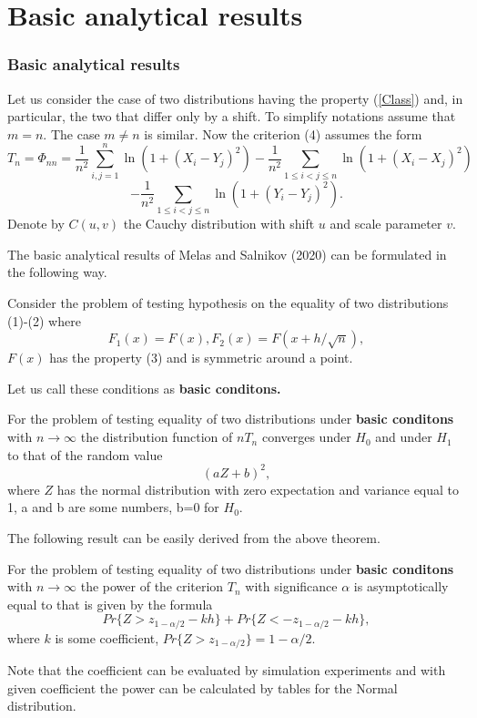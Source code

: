 \documentclass[slidestop,usepdftitle=false]{beamer}
\begin{document}
\section{Basic analytical results}
\begin{slide}
\frametitle{Basic analytical results}
Let us consider the case of two distributions having the property (\ref{Class}) and, in particular, the two that differ only by a shift. To simplify notations assume that $m=n$. The case $m\ne n$ is similar.
Now the criterion  (4)  assumes the form
\begin{equation}
T_n=\Phi_{nn}= \frac{1}{n^2}\sum_{i,j=1}^n \ln(1 + (X_i - Y_j)^2)-\frac{1}{n^2}\sum_{1\leq i<j\leq n}  \ln(1 + (X_i - X_j)^2)
\end{equation}
\begin{equation}
-  \frac{1}{n^2}\sum_{1\leq i<j\leq n}  \ln(1 + (Y_i - Y_j)^2).
\end{equation}
Denote by $C(u,v)$ the Cauchy distribution with shift $u$ and scale parameter $v$.
\end{slide}
\begin{slide}
The basic analytical results of  Melas and Salnikov (2020) can be formulated in the following way.

\bigskip
\bigskip
Consider the problem of testing hypothesis on the equality of two distributions (1)-(2) where
$$
 F_1(x)=F(x), 
 F_2(x)=F(x + h/\sqrt{n}),
 $$
 $F(x)$  has the property (3) and is symmetric around a point.
  
Let us call these conditions as \bf{basic conditons}. 
 \end{slide}
 \begin{slide}
 \bigskip
 \bigskip


 \begin{theorem}
For the problem of testing equality of two distributions under {\bf basic conditons} with $n \to \infty$
the distribution function of $nT_n$  converges under $H_0$ and  under $H_1$ to that of the random value
\begin{equation*}
(aZ + b)^2,
\end{equation*}
where  $Z$ has the normal distribution with zero expectation and variance equal to 1, a and
b are some numbers, b=0 for $H_0$.
\end{theorem}
\end{slide}
\begin{slide}
The following result can be easily derived from the above theorem.
\begin{theorem}
For the problem of testing equality of two distributions under {\bf basic conditons} with $n \to \infty$
the power of the criterion $T_n$ with significance $\alpha$ is asymptotically equal to that is given by the formula
$$
Pr\{Z>z_{1-\alpha/2} - kh\} + Pr\{Z <-z_{1-\alpha/2} - kh\},
$$
where $k$ is some coefficient, $Pr\{Z>z_{1-\alpha/2}\}=1-\alpha/2$.
\end{theorem}
Note that the coefficient can be evaluated by simulation experiments and with given coefficient the power can be calculated by tables for the Normal distribution. 
\end{slide}
\end{document}
